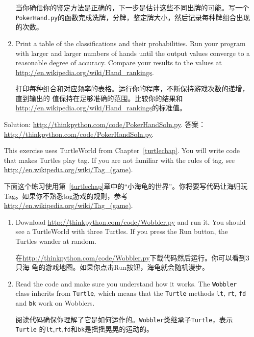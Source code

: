 \documentclass[10pt]{book}
\begin{document}
\begin{CJK}{UTF8}{gbsn}
\begin{exercise}
\begin{enumerate}
当你确信你的鉴定方法是正确的，下一步是估计这些不同出牌的可能。写一个{\tt
PokerHand.py}的函数完成洗牌，分牌，鉴定牌大小，然后记录每种牌组合出现的次数。

\item Print a table of the classifications and their probabilities.
Run your program with larger and larger numbers of hands until the
output values converge to a reasonable degree of accuracy.  Compare
your results to the values at \url{http://en.wikipedia.org/wiki/Hand_rankings}.

打印每种组合和对应频率的表格。运行你的程序，不断保持游戏次数的递增，直到输出的
值保持在足够准确的范围。比较你的结果和
\url{http://en.wikipedia.org/wiki/Hand_rankings}的标准值。

\end{enumerate}

Solution: \url{http://thinkpython.com/code/PokerHandSoln.py}.
答案：\url{http://thinkpython.com/code/PokerHandSoln.py}.
\end{exercise}


\begin{exercise}

This exercise uses TurtleWorld from Chapter~\ref{turtlechap}.
You will write code that makes Turtles play tag.  If you
are not familiar with the rules of tag, see
\url{http://en.wikipedia.org/wiki/Tag_(game)}.

下面这个练习使用第~\ref{turtlechap}章中的``小海龟的世界''。你将要写代码让海归玩
Tag。如果你不熟悉tag游戏的规则，参考
\url{http://en.wikipedia.org/wiki/Tag_(game)}.

\begin{enumerate}

\item Download \url{http://thinkpython.com/code/Wobbler.py} and run it.  You
should see a TurtleWorld with three Turtles.  If you press the
{\sf Run} button, the Turtles wander at random.

在\url{http://thinkpython.com/code/Wobbler.py}下载代码然后运行。你可以看到3只海
龟的游戏地图。如果你点击{\sf Run}按钮，海龟就会随机漫步。

\item Read the code and make sure you understand how it works.
The {\tt Wobbler} class inherits from {\tt Turtle}, which means
that the {\tt Turtle} methods {\tt lt}, {\tt rt}, {\tt fd}
and {\tt bk} work on Wobblers.

阅读代码确保你理解了它是如何运作的。{\tt Wobbler}类继承子{\tt Turtle}，表示{\tt Turtle}
的{\tt lt},{\tt rt},{\tt fd}和{\tt bk}是摇摇晃晃的运动的。


\end{enumerate}
\end{exercise}
\end{CJK}
\end{document}
